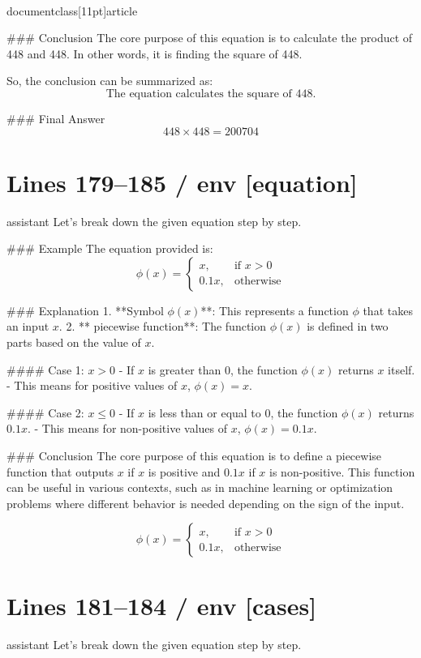 \\documentclass[11pt]{article}
\begin{document}
### Conclusion
The core purpose of this equation is to calculate the product of 448 and 448. In other words, it is finding the square of 448.

So, the conclusion can be summarized as:
\[ \text{The equation calculates the square of 448.} \]

### Final Answer
\[
\boxed{448 \times 448 = 200704}
\]


\section*{Lines 179–185 / env [equation]}
assistant
Let's break down the given equation step by step.

### Example
The equation provided is:
\[
\phi(x) =
\begin{cases}
    x, & \text{if } x > 0\\
    0.1x, & \text{otherwise}
\end{cases}
\]

### Explanation
1. **Symbol \(\phi(x)\)**: This represents a function \(\phi\) that takes an input \(x\).
2. ** piecewise function**: The function \(\phi(x)\) is defined in two parts based on the value of \(x\).

#### Case 1: \(x > 0\)
- If \(x\) is greater than 0, the function \(\phi(x)\) returns \(x\) itself.
- This means for positive values of \(x\), \(\phi(x) = x\).

#### Case 2: \(x \leq 0\)
- If \(x\) is less than or equal to 0, the function \(\phi(x)\) returns \(0.1x\).
- This means for non-positive values of \(x\), \(\phi(x) = 0.1x\).

### Conclusion
The core purpose of this equation is to define a piecewise function that outputs \(x\) if \(x\) is positive and \(0.1x\) if \(x\) is non-positive. This function can be useful in various contexts, such as in machine learning or optimization problems where different behavior is needed depending on the sign of the input.

\[
\boxed{\phi(x) =
\begin{cases}
    x, & \text{if } x > 0\\
    0.1x, & \text{otherwise}
\end{cases}}
\]


\section*{Lines 181–184 / env [cases]}
assistant
Let's break down the given equation step by step.
\end{document}
